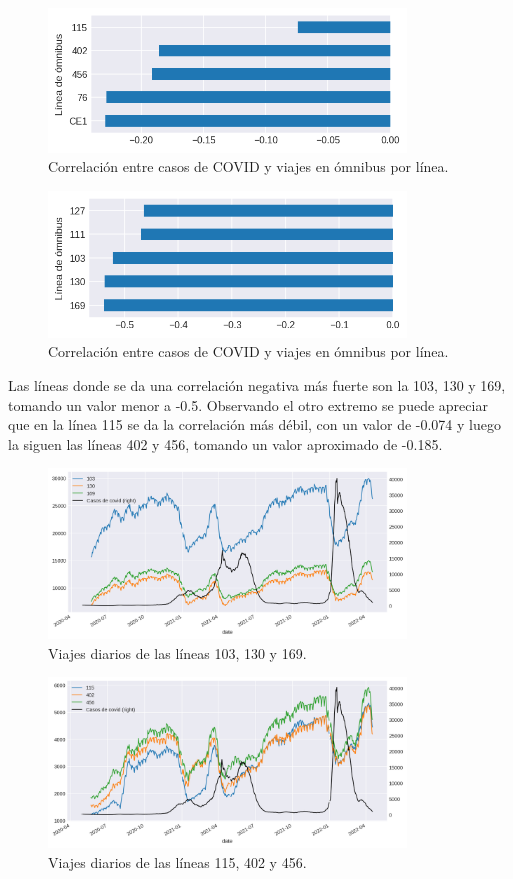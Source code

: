 \documentclass[conference]{IEEEtran}
\begin{document}
\begin{figure}[htbp]
\centerline{\includegraphics[width=95mm]{Pictures/cl1c.png}}
\caption{Correlación entre casos de COVID y viajes en ómnibus por línea.}
\label{clc1}
\end{figure}

\begin{figure}[htbp]
\centerline{\includegraphics[width=95mm]{Pictures/cl2c.png}}
\caption{Correlación entre casos de COVID y viajes en ómnibus por línea.}
\label{clc2}
\end{figure}

Las líneas donde se da una correlación negativa más fuerte son la 103, 130 y 169, tomando un valor menor a -0.5. Observando el otro extremo se puede apreciar que en la línea 115 se da la correlación más débil, con un valor de -0.074 y luego la siguen las líneas 402 y 456, tomando un valor aproximado de -0.185.

\begin{figure}[htbp]
\centerline{\includegraphics[width=95mm]{Pictures/cl1p.png}}
\caption{Viajes diarios de las líneas 103, 130 y 169.}
\label{cl1p}
\end{figure}

\begin{figure}[htbp]
\centerline{\includegraphics[width=95mm]{Pictures/cl2p.png}}
\caption{Viajes diarios de las líneas 115, 402 y 456.}
\label{cl2p}
\end{figure}
\end{document}
